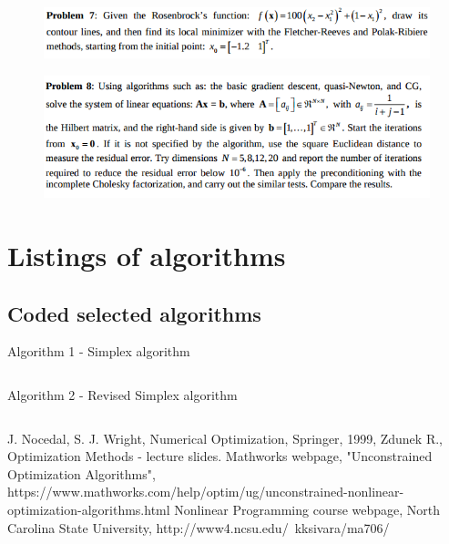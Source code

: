 \documentclass[eng,openany]{mgr}
\begin{document}
\clearpage
\begin{figure}[h]
\centering
\includegraphics[width=0.7\linewidth]{screenshot016}
\label{fig:screenshot016}
\end{figure}










\clearpage
\begin{figure}[h]
\centering
\includegraphics[width=0.7\linewidth]{screenshot017}
\label{fig:screenshot017}
\end{figure}







\clearpage
\chapter{Listings of algorithms}
\section{Coded selected algorithms}
Algorithm 1 - Simplex algorithm\\ 
\begin{lstlisting}

\end{lstlisting}
\newpage
Algorithm 2 - Revised Simplex algorithm\\
\begin{lstlisting}

\end{lstlisting}
\begin{thebibliography}{8}
J. Nocedal, S. J. Wright, Numerical Optimization, Springer, 1999,
Zdunek R., Optimization Methods - lecture slides.
Mathworks webpage, "Unconstrained Optimization Algorithms", https://www.mathworks.com/help/optim/ug/unconstrained-nonlinear-optimization-algorithms.html
Nonlinear Programming course webpage, North Carolina State University,
http://www4.ncsu.edu/~kksivara/ma706/
\end{thebibliography}
\end{document}
